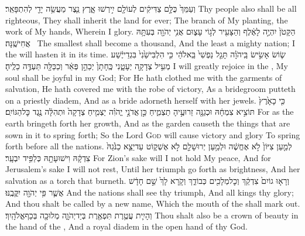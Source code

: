 {וְעַמֵּךְ֙ כֻּלָּ֣ם צַדִּיקִ֔ים לְעוֹלָ֖ם יִ֣ירְשׁוּ אָ֑רֶץ נֵ֧צֶר  מַעֲשֵׂ֥ה יָדַ֖י לְהִתְפָּאֵֽר׃}
{Thy people also shall be all righteous, They shall inherit the land for ever; The branch of My planting, the work of My hands, Wherein I glory.}
{הַקָּטֹן֙ יִהְיֶ֣ה לָאֶ֔לֶף וְהַצָּעִ֖יר לְג֣וֹי עָצ֑וּם אֲנִ֥י יְהֹוָ֖ה בְּעִתָּ֥הּ אֲחִישֶֽׁנָּה׃ \setuma }
{The smallest shall become a thousand, And the least a mighty nation; I the \lord\space will hasten it in its time.}
\label{haft_51}
\setcounter{chap}{61}
\setcounter{verse}{10}
{שׂ֧וֹשׂ אָשִׂ֣ישׂ בַּֽיהֹוָ֗ה תָּגֵ֤ל נַפְשִׁי֙ בֵּֽאלֹהַ֔י כִּ֤י הִלְבִּישַׁ֙נִי֙ בִּגְדֵי\maqqaf יֶ֔שַׁע מְעִ֥יל צְדָקָ֖ה יְעָטָ֑נִי כֶּֽחָתָן֙ יְכַהֵ֣ן פְּאֵ֔ר וְכַכַּלָּ֖ה תַּעְדֶּ֥ה כֵלֶֽיהָ׃}
{I will greatly rejoice in the \lord, My soul shall be joyful in my God; For He hath clothed me with the garments of salvation, He hath covered me with the robe of victory, As a bridegroom putteth on a priestly diadem, And as a bride adorneth herself with her jewels.}
{כִּ֤י כָאָ֙רֶץ֙ תּוֹצִ֣יא צִמְחָ֔הּ וּכְגַנָּ֖ה זֵרוּעֶ֣יהָ תַצְמִ֑יחַ כֵּ֣ן \legarmeh  אֲדֹנָ֣י יֱהֹוִ֗ה יַצְמִ֤יחַ צְדָקָה֙ וּתְהִלָּ֔ה נֶ֖גֶד כׇּל\maqqaf הַגּוֹיִֽם׃}
{For as the earth bringeth forth her growth, And as the garden causeth the things that are sown in it to spring forth; So the Lord \textsc{God} will cause victory and glory To spring forth before all the nations.}
\newperek
{}
{לְמַ֤עַן צִיּוֹן֙ לֹ֣א אֶחֱשֶׁ֔ה וּלְמַ֥עַן יְרוּשָׁלַ֖͏ִם לֹ֣א אֶשְׁק֑וֹט עַד\maqqaf יֵצֵ֤א כַנֹּ֙גַהּ֙ צִדְקָ֔הּ וִישׁוּעָתָ֖הּ כְּלַפִּ֥יד יִבְעָֽר׃}
{For Zion’s sake will I not hold My peace, And for Jerusalem’s sake I will not rest, Until her triumph go forth as brightness, And her salvation as a torch that burneth.}
{וְרָא֤וּ גוֹיִם֙ צִדְקֵ֔ךְ וְכׇל\maqqaf מְלָכִ֖ים כְּבוֹדֵ֑ךְ וְקֹ֤רָא לָךְ֙ שֵׁ֣ם חָדָ֔שׁ אֲשֶׁ֛ר פִּ֥י יְהֹוָ֖ה יִקֳּבֶֽנּוּ׃}
{And the nations shall see thy triumph, And all kings thy glory; And thou shalt be called by a new name, Which the mouth of the \lord\space shall mark out.}
{וְהָיִ֛ית עֲטֶ֥רֶת תִּפְאֶ֖רֶת בְּיַד\maqqaf יְהֹוָ֑ה  מְלוּכָ֖ה בְּכַף\maqqaf אֱלֹהָֽיִךְ׃}
{Thou shalt also be a crown of beauty in the hand of the \lord, And a royal diadem in the open hand of thy God.}
